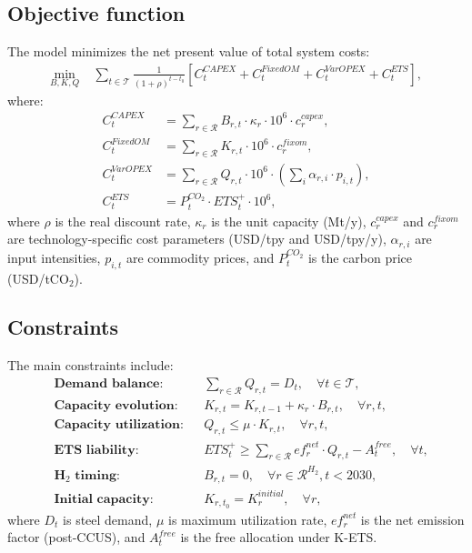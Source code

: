 \documentclass[preprint,5p,authoryear]{elsarticle}
\begin{document}
\subsection{Objective function}
The model minimizes the net present value of total system costs:
\begin{align}
\min_{B,K,Q} \; & \sum_{t \in \mathcal{T}} \frac{1}{(1+\rho)^{t-t_0}}
\left[ C^{CAPEX}_t + C^{FixedOM}_t + C^{VarOPEX}_t + C^{ETS}_t \right],
\end{align}
where:
\begin{align}
C^{CAPEX}_t &= \sum_{r \in \mathcal{R}} B_{r,t} \cdot \kappa_r \cdot 10^6 \cdot c^{capex}_r, \\
C^{FixedOM}_t &= \sum_{r \in \mathcal{R}} K_{r,t} \cdot 10^6 \cdot c^{fixom}_r, \\
C^{VarOPEX}_t &= \sum_{r \in \mathcal{R}} Q_{r,t} \cdot 10^6 \cdot \left( \sum_{i} \alpha_{r,i} \cdot p_{i,t} \right), \\
C^{ETS}_t &= P^{CO_2}_t \cdot ETS_t^+ \cdot 10^6,
\end{align}
where $\rho$ is the real discount rate, $\kappa_r$ is the unit capacity (Mt/y), $c^{capex}_r$ and $c^{fixom}_r$ are technology-specific cost parameters (USD/tpy and USD/tpy/y), $\alpha_{r,i}$ are input intensities, $p_{i,t}$ are commodity prices, and $P^{CO_2}_t$ is the carbon price (USD/tCO$_2$).

\subsection{Constraints}
The main constraints include:
\begin{align}
&\textbf{Demand balance:} && \sum_{r \in \mathcal{R}} Q_{r,t} = D_t, \quad \forall t \in \mathcal{T}, \\
&\textbf{Capacity evolution:} && K_{r,t} = K_{r,t-1} + \kappa_r \cdot B_{r,t}, \quad \forall r,t, \\
&\textbf{Capacity utilization:} && Q_{r,t} \le \mu \cdot K_{r,t}, \quad \forall r,t, \\
&\textbf{ETS liability:} && ETS_t^+ \ge \sum_{r \in \mathcal{R}} ef_r^{net} \cdot Q_{r,t} - A_t^{free}, \quad \forall t, \\
&\textbf{H$_2$ timing:} && B_{r,t} = 0, \quad \forall r \in \mathcal{R}^{H_2}, t < 2030, \\
&\textbf{Initial capacity:} && K_{r,t_0} = K_r^{initial}, \quad \forall r,
\end{align}
where $D_t$ is steel demand, $\mu$ is maximum utilization rate, $ef_r^{net}$ is the net emission factor (post-CCUS), and $A_t^{free}$ is the free allocation under K-ETS.
\end{document}
